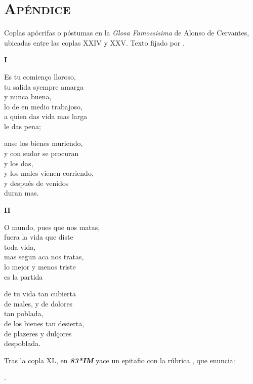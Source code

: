 \documentclass[11pt,twoside]{article}
\newcommand{\im}{\emph{\textbf{83*IM}}}
\begin{document}
\section*{\centering\textsc{Apéndice}}
%
Coplas apócrifas o póstumas en la \emph{Glosa Famossisima} de Alonso de Cervantes, ubicadas entre las coplas XXIV y XXV. Texto fijado por \textcite{Foulché-Delbosc1902}.\par\vspace{5pt}
%
\begin{center}
\textbf{I}
\end{center}
\beginnumbering
\pstart
		Es tu comienço lloroso,\\
		tu salida syempre amarga\\
		y nunca buena,\\
		lo de en medio trabajoso,\\
		a quien das vida mas larga\\
		le das pena;\par
		anse los bienes muriendo,\\
		y con sudor se procuran\\
		y los das,\\
		y los males vienen corriendo,\\
		y después de venidos\\
		duran mas.\par
		\pend
		\endnumbering
		\vspace*{11pt}
%
\begin{center}
\textbf{II}
\end{center}
		\beginnumbering
		\pstart
		O mundo, pues que nos matas,\\
		fuera la vida que diste\\
		toda vida,\\
		mas segun aca nos tratas,\\
		lo mejor y menos triste\\
		es la partida\par
		de tu vida tan cubierta\\
		de males, y de dolores\\
		tan poblada,\\
		de los bienes tan desierta,\\
		de plazeres y dulçores\\
		despoblada.\par
		\pend
		\endnumbering\par
%
\vspace{11pt} Tras la copla XL, en {\im} yace un epitafio con la rúbrica , que enuncia:\vspace{5pt}\par
%
.
\enpage
%
\end{document}
